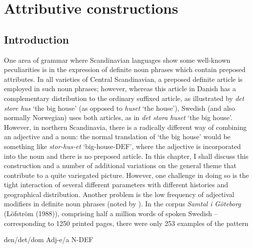 \chapter[Attributive constructions]{Attributive constructions}
\section{Introduction}
\label{bkm:Ref262028996}
\begin{styleBodytextC}
One area of grammar where Scandinavian languages show some well-known peculiarities is in the expression of definite noun phrases which contain preposed attributes. In all varieties of Central Scandinavian, a preposed definite article is employed in such noun phrases; however, whereas this article in Danish has a complementary distribution to the ordinary suffixed article, as illustrated by \textit{det store hus} ‘the big house’ (as opposed to \textit{huset} ‘the house’), Swedish (and also normally Norwegian) uses both articles, as in \textit{det stora huset} ‘the big house’. However, in northern Scandinavia, there is a radically different way of combining an adjective and a noun: the normal translation of ‘the big house’ would be something like \textit{stor-hus-et} ‘big-house-DEF’, where the adjective is incorporated into the noun and there is no preposed article. In this chapter, I shall discuss this construction and a number of additional variations on the general theme that contribute to a quite variegated picture. However, one challenge in doing so is the tight interaction of several different parameters with different histories and geographical distribution. Another problem is the low frequency of adjectival modifiers in definite noun phrases (noted by \citet{Thompson1988}). In the corpus \textit{Samtal i Göteborg }(Löfström (1988)), comprising half a million words of spoken Swedish – corresponding to 1250 printed pages, there were only 253 examples of the pattern

\end{styleBodytextC}

\begin{listWWNumileveli}
\item {}

\begin{styleExample}
den/det/dom Adj-e/a N-DEF

\end{styleExample}

\end{listWWNumileveli}

